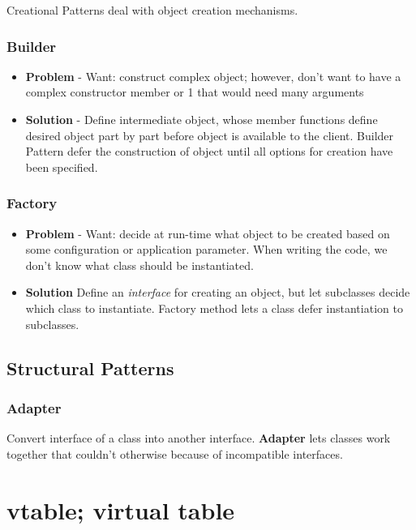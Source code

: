 \documentclass[10pt]{amsart}
\begin{document}
\begin{multicols*}{2}
Creational Patterns deal with object creation mechanisms.  

\subsubsection{Builder}  

\begin{itemize}
	\item \textbf{Problem} - Want: construct complex object; however, don't want to have a complex constructor member or 1 that would need many arguments 
	\item \textbf{Solution} - Define intermediate object, whose member functions define desired object part by part before object is available to the client.  Builder Pattern defer the construction of object until all options for creation have been specified.  
\end{itemize}

\subsubsection{Factory}

\begin{itemize}
	\item \textbf{Problem} - Want: decide at run-time what object to be created based on some configuration or application parameter.  When writing the code, we don't know what class should be instantiated.  
	\item \textbf{Solution} Define an \emph{interface} for creating an object, but let subclasses decide which class to instantiate.  Factory method lets a class defer instantiation to subclasses.   
\end{itemize}

\subsection{Structural Patterns}

\subsubsection{Adapter} 

Convert interface of a class into another interface.  \textbf{Adapter} lets classes work together that couldn't otherwise because of incompatible interfaces.  


\section{vtable; virtual table}  


\end{multicols*}
\end{document}
